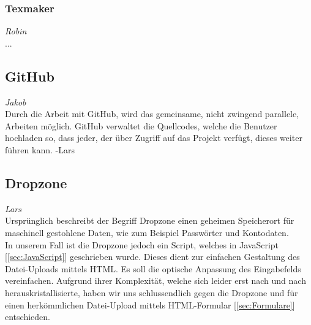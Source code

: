 \documentclass[12pt,a4paper,bibliography=totocnumbered,listof=totocnumbered]{scrartcl}
\begin{document}
\subsubsection{Texmaker}
\label{sec:Texmaker}
\emph{Robin}\\
...

\subsection{GitHub}
\label{sec:GitHub}
\emph{Jakob}\\
Durch die Arbeit mit GitHub, wird das gemeinsame, nicht zwingend parallele, Arbeiten möglich. GitHub verwaltet die Quellcodes, welche die Benutzer hochladen so, dass jeder, der über Zugriff auf das Projekt verfügt, dieses weiter führen kann. -Lars

\subsection{Dropzone}
\label{sec:Dropzone}
\emph{Lars}\\
Ursprünglich beschreibt der Begriff \glqq Dropzone\grqq{} einen geheimen Speicherort für maschinell gestohlene Daten, wie zum Beispiel Passwörter und Kontodaten.\cite{wiki/Dropzone} \\
In unserem Fall ist die Dropzone jedoch ein Script, welches in JavaScript [\ref{sec:JavaScript}] geschrieben wurde. Dieses dient zur einfachen Gestaltung des Datei-Uploads mittels HTML. Es soll die optische Anpassung des Eingabefelds vereinfachen. 
Aufgrund ihrer Komplexität, welche sich leider erst nach und nach herauskristallisierte, haben wir uns schlussendlich gegen die Dropzone und für einen herkömmlichen Datei-Upload mittels HTML-Formular [\ref{sec:Formulare}] entschieden.
\end{document}

